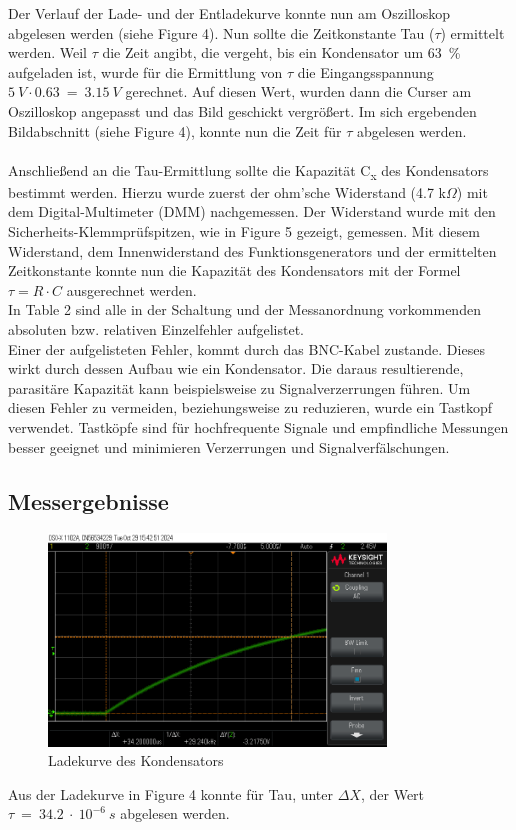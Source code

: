 \documentclass[a4paper,12pt]{article}
\begin{document}
\noindent Der Verlauf der Lade- und der Entladekurve konnte nun am Oszilloskop abgelesen werden (siehe Figure 4). Nun sollte die Zeitkonstante Tau ($\tau$) ermittelt werden. Weil $\tau$ die Zeit angibt, die vergeht, bis ein Kondensator um 63~\% aufgeladen ist, wurde für die Ermittlung von $\tau$ die Eingangsspannung \(5~V \cdot 0.63~=~3.15~V\) gerechnet. Auf diesen Wert, wurden dann die Curser am Oszilloskop angepasst und das Bild geschickt vergrößert. Im sich ergebenden Bildabschnitt (siehe Figure 4), konnte nun die Zeit für $\tau$ abgelesen werden.\\\\
Anschließend an die Tau-Ermittlung sollte die Kapazität C\textsubscript{x} des Kondensators bestimmt werden. Hierzu wurde zuerst der ohm'sche Widerstand (4.7 k$\Omega$) mit dem Digital-Multimeter (DMM) nachgemessen. Der Widerstand wurde mit den Sicherheits-Klemmprüfspitzen, wie in Figure 5 gezeigt, gemessen. Mit diesem Widerstand, dem Innenwiderstand des Funktionsgenerators und der ermittelten Zeitkonstante konnte nun die Kapazität des Kondensators mit der Formel $\tau = R \cdot C$ ausgerechnet werden.\\
In Table 2 sind alle in der Schaltung und der Messanordnung vorkommenden absoluten bzw. relativen Einzelfehler aufgelistet.\\Einer der aufgelisteten Fehler, kommt durch das BNC-Kabel zustande. Dieses wirkt durch dessen Aufbau wie ein Kondensator. Die daraus resultierende, parasitäre Kapazität kann beispielsweise zu Signalverzerrungen führen. Um diesen Fehler zu vermeiden, beziehungsweise zu reduzieren, wurde ein Tastkopf verwendet. Tastköpfe sind für hochfrequente Signale und empfindliche Messungen besser geeignet und minimieren Verzerrungen und Signalverfälschungen.

\subsection{Messergebnisse}

\begin{figure}[H]
    \centering
    \includegraphics[width=0.8\textwidth]{../Quellen/Labor2/scope_1.png}
\caption{Ladekurve des Kondensators}
\end{figure}
Aus der Ladekurve in Figure 4 konnte für Tau, unter $\Delta X$, der Wert \(\tau~=~34.2~\cdot~10^{-6}~s\) abgelesen werden.\\
\end{document}
